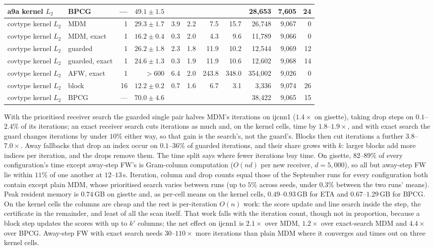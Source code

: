 \documentclass{opt2026}   %
\begin{document}
\begin{table}[h]
\begin{tabular}{llrrrrrrrrr}
a9a kernel $L_2$ & BPCG & --- & $49.1\pm1.5$ &  & & & & 28,653 & 7,605 & 24 \\
\midrule
covtype kernel $L_2$ & MDM & 1 & $29.3\pm1.7$ & 3.9 & 2.2 & 7.5 & 15.7 & 26,748 & 9,067 & 0 \\
covtype kernel $L_2$ & MDM, exact & 1 & $16.2\pm0.4$ & 0.3 & 2.0 & 4.3 & 9.6 & 11,789 & 9,066 & 0 \\
covtype kernel $L_2$ & guarded & 1 & $26.2\pm1.8$ & 2.3 & 1.8 & 11.9 & 10.2 & 12,544 & 9,069 & 12 \\
covtype kernel $L_2$ & guarded, exact & 1 & $24.6\pm1.3$ & 0.3 & 1.9 & 11.9 & 10.6 & 12,602 & 9,068 & 14 \\
covtype kernel $L_2$ & AFW, exact & 1 & $>600$ & 6.4 & 2.0 & 243.8 & 348.0 & 354,002 & 9,026 & 0 \\
covtype kernel $L_2$ & block & 16 & $12.2\pm0.2$ & 0.7 & 1.6 & 6.7 & 3.1 & 3,336 & 9,074 & 26 \\
covtype kernel $L_2$ & BPCG & --- & $70.0\pm4.6$ &  & & & & 38,422 & 9,065 & 15 \\
\bottomrule\end{tabular}\end{table}

With the prioritised receiver search the guarded single pair halves
MDM's iterations on ijcnn1 ($1.4\times$ on gisette), taking drop steps
on $0.1$--$2.4\%$ of its iterations; an exact receiver search cuts
iterations as much and, on the kernel cells, time by $1.8$--$1.9\times$,
and with exact search the guard changes iterations by under $10\%$
either way, so that gain is the search's, not the guard's. Blocks then cut
iterations a further $3.8$--$7.0\times$. Away fallbacks that drop an
index occur on $0.1$--$36\%$ of guarded iterations, and their share
grows with $k$: larger blocks add more indices per iteration, and the
drops remove them. The time split says where fewer iterations buy time.
On gisette, $82$--$89\%$ of every configuration's time except
away-step FW's is Gram-column computation ($O(nd)$ per new receiver,
$d{=}5{,}000$), so all but away-step FW lie within $11\%$ of one another at $12$--$13$\,s.
Iteration, column and drop counts equal those of the September runs for
every configuration both contain except plain MDM, whose prioritised
search varies between runs (up to $5\%$ across seeds, under $0.3\%$
between the two runs' means). Peak resident memory is $0.74$\,GB on
gisette and, as per-cell means on the kernel cells, $0.49$--$0.93$\,GB
for ETA and $0.67$--$1.29$\,GB for BPCG. On the kernel cells the columns are cheap and the rest
is per-iteration $O(n)$ work: the score update and line search inside
the step, the certificate in the remainder, and least of all the scan
itself. That work falls with the iteration count, though not in
proportion, because a block step updates the scores with up to $k'$
columns; the net effect on ijcnn1 is $2.1\times$ over MDM, $1.2\times$
over exact-search MDM and $4.4\times$ over BPCG. Away-step FW with exact
search needs $30$--$110\times$ more iterations than plain MDM where it
converges and times out on three kernel cells.
\end{document}
